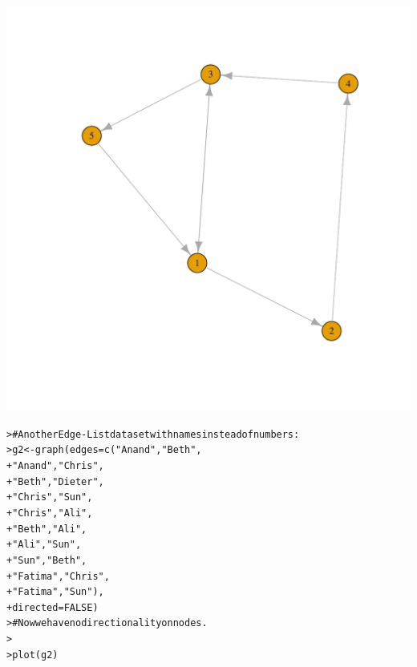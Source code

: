 \documentclass[12pt]{article}\usepackage[]{graphicx}\usepackage[]{color}
\makeatletter
\newcommand{\hlnum}[1]{\textcolor[rgb]{0.82,0.78,0.62}{#1}}%
\newcommand{\hlstr}[1]{\textcolor[rgb]{0.82,0.78,0.62}{#1}}%
\newcommand{\hlcom}[1]{\textcolor[rgb]{0.404,0.408,0.42}{#1}}%
\newcommand{\hlstd}[1]{\textcolor[rgb]{0.882,0.878,0.898}{#1}}%
\newcommand{\hlkwb}[1]{\textcolor[rgb]{0.902,0.675,0.196}{#1}}%
\newcommand{\hlkwc}[1]{\textcolor[rgb]{0.812,0.522,0.388}{#1}}%
\newcommand{\hlkwd}[1]{\textcolor[rgb]{0.733,0.388,0.812}{#1}}%
\newenvironment{kframe}{%
 \def\at@end@of@kframe{}%
 \ifinner\ifhmode%
  \def\at@end@of@kframe{\end{minipage}}%
  \begin{minipage}{\columnwidth}%
 \fi\fi%
 \def\FrameCommand##1{\hskip\@totalleftmargin \hskip-\fboxsep
 \colorbox{shadecolor}{##1}\hskip-\fboxsep
     \hskip-\linewidth \hskip-\@totalleftmargin \hskip\columnwidth}%
 \MakeFramed {\advance\hsize-\width
   \@totalleftmargin\z@ \linewidth\hsize
   \@setminipage}}%
 {\par\unskip\endMakeFramed%
 \at@end@of@kframe}
\newenvironment{knitrout}{}{} %
\makeatother
\begin{document}
\begin{flushleft}
\begin{center}
\begin{knitrout}
\includegraphics[width=6in]{figure/Network_Basics-1} 
\begin{kframe}\begin{alltt}
\hlstd{> }\hlcom{# Another Edge-List dataset with names instead of numbers:}
\hlstd{> }\hlstd{g2} \hlkwb{<-} \hlkwd{graph}\hlstd{(}\hlkwc{edges}\hlstd{=}\hlkwd{c}\hlstd{(}\hlstr{"Anand"}\hlstd{,}\hlstr{"Beth"}\hlstd{,}
\hlstd{+ }                    \hlstr{"Anand"}\hlstd{,}\hlstr{"Chris"}\hlstd{,}
\hlstd{+ }                    \hlstr{"Beth"}\hlstd{,}\hlstr{"Dieter"}\hlstd{,}
\hlstd{+ }                    \hlstr{"Chris"}\hlstd{,}\hlstr{"Sun"}\hlstd{,}
\hlstd{+ }                    \hlstr{"Chris"}\hlstd{,}\hlstr{"Ali"}\hlstd{,}
\hlstd{+ }                    \hlstr{"Beth"}\hlstd{,}\hlstr{"Ali"}\hlstd{,}
\hlstd{+ }                    \hlstr{"Ali"}\hlstd{,}\hlstr{"Sun"}\hlstd{,}
\hlstd{+ }                    \hlstr{"Sun"}\hlstd{,}\hlstr{"Beth"}\hlstd{,}
\hlstd{+ }                    \hlstr{"Fatima"}\hlstd{,}\hlstr{"Chris"}\hlstd{,}
\hlstd{+ }                    \hlstr{"Fatima"}\hlstd{,}\hlstr{"Sun"}\hlstd{),}
\hlstd{+ }            \hlkwc{directed}\hlstd{=}\hlnum{FALSE}\hlstd{)}
\hlstd{> }\hlcom{# Now we have no directionality on nodes.}
\hlstd{> }
\hlstd{> }\hlkwd{plot}\hlstd{(g2)}
\end{alltt}
\end{kframe}

\end{knitrout}
\end{center}
\end{flushleft}
\end{document}

